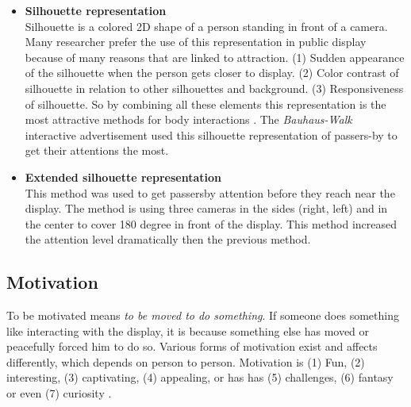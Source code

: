 \begin{itemize}

\item \textbf{Silhouette representation} \\
Silhouette is a colored 2D shape of a person standing in front of a camera. Many researcher prefer the use of this representation in public display because of many reasons that are linked to attraction. (1) Sudden appearance of the silhouette when the person gets closer to display. (2) Color contrast of silhouette in relation to other silhouettes and background. (3) Responsiveness of silhouette.  So by combining all these elements this representation is the most attractive methods for body interactions \cite{LookingGlass}. The \emph{Bauhaus-Walk} interactive advertisement used this silhouette representation of passers-by to get their attentions the most.


\item \textbf{Extended silhouette representation} \\
This method was used to get passersby attention before they reach near the display. The method is using three cameras in the sides (right, left) and in the center to cover 180 degree in front of the display. This method increased the attention level dramatically then the previous method.


\end{itemize}

\subsection{Motivation}
To be motivated means \emph{to be moved to do something}\cite{motiv}. If someone does something like interacting with the display, it is because something else has moved or peacefully forced him to do so. Various forms of motivation exist and affects differently, which depends on person to person. Motivation is (1) Fun, (2) interesting, (3) captivating, (4) appealing, or has has (5) challenges, (6) fantasy or even (7) curiosity \cite{toward_motivation}. 

